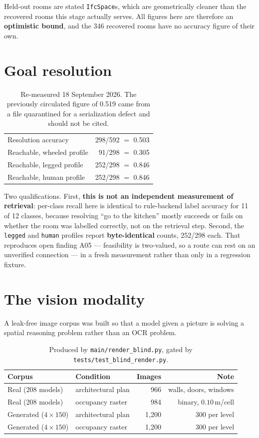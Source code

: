 \documentclass[11pt,a4paper]{article}
\newcommand{\code}[1]{\texttt{\small #1}}
\begin{document}
\noindent
Held-out rooms are stated \code{IfcSpace}s, which are geometrically cleaner than
the recovered rooms this stage actually serves. All figures here are therefore
an \textbf{optimistic bound}, and the 346 recovered rooms have no accuracy
figure of their own.

\section{Goal resolution}

\begin{table}[ht]
\centering
\small
\begin{tabular}{lr}
\toprule
Resolution accuracy & 298/592 $=$ 0.503 \\
Reachable, wheeled profile & 91/298 $=$ 0.305 \\
Reachable, legged profile & 252/298 $=$ 0.846 \\
Reachable, human profile & 252/298 $=$ 0.846 \\
\bottomrule
\end{tabular}
\caption{Re-measured 18 September 2026. The previously circulated figure of
0.519 came from a file quarantined for a serialization defect and should not be
cited.}
\end{table}

\noindent
Two qualifications. First, \textbf{this is not an independent measurement of
retrieval}: per-class recall here is identical to rule-backend label accuracy
for 11 of 12 classes, because resolving ``go to the kitchen'' mostly succeeds or
fails on whether the room was labelled correctly, not on the retrieval step.
Second, the \code{legged} and \code{human} profiles report \textbf{byte-identical}
counts, 252/298 each. That reproduces open finding A05 --- feasibility is
two-valued, so a route can rest on an unverified connection --- in a fresh
measurement rather than only in a regression fixture.

\section{The vision modality}

A leak-free image corpus was built so that a model given a picture is solving a
spatial reasoning problem rather than an OCR problem.

\begin{table}[ht]
\centering
\small
\begin{tabular}{llrr}
\toprule
Corpus & Condition & Images & Note \\
\midrule
Real (208 models) & architectural plan & 966 & walls, doors, windows \\
Real (208 models) & occupancy raster & 984 & binary, $0.10$\,m/cell \\
Generated ($4\times150$) & architectural plan & 1{,}200 & 300 per level \\
Generated ($4\times150$) & occupancy raster & 1{,}200 & 300 per level \\
\bottomrule
\end{tabular}
\caption{Produced by \code{main/render\_blind.py}, gated by
\code{tests/test\_blind\_render.py}.}
\end{table}
\end{document}
